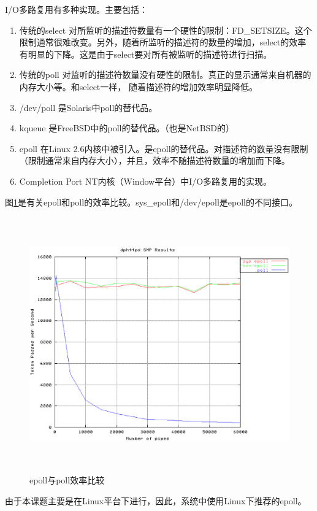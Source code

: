 \documentclass[12pt, twoside, a4paper, xetex]{report}
\begin{document}
	I/O多路复用有多种实现。主要包括：
	\begin{enumerate}
		\item 传统的select 对所监听的描述符数量有一个硬性的限制：FD\_SETSIZE。这个限制通常很难改变。另外，随着所监听的描述符的数量的增加，select的效率有明显的下降。这是由于select要对所有被监听的描述符进行扫描。
		\item 传统的poll 对监听的描述符数量没有硬性的限制。真正的显示通常来自机器的内存大小等。和select一样， 随着描述符的增加效率明显降低。
		\item /dev/poll 是Solaris中poll的替代品。
		\item kqueue 是FreeBSD中的poll的替代品。（也是NetBSD的）
		\item epoll 在Linux 2.6内核中被引入。是epoll的替代品。对描述符的数量没有限制（限制通常来自内存大小），并且，效率不随描述符数量的增加而下降。
		\item Completion Port NT内核（Window平台）中I/O多路复用的实现。
	\end{enumerate}
	
	图\ref{epollvspoll}是有关epoll和poll的效率比较。sys\_epoll和/dev/epoll是epoll的不同接口。
	\begin{figure}[htbp]
	\centering
	\caption{epoll与poll效率比较}
	\label{epollvspoll}
	\includegraphics[height=11cm, width=15cm]{pics/epollvspoll.eps}
	\end{figure}
	
	由于本课题主要是在Linux平台下进行，因此，系统中使用Linux下推荐的epoll。
	
\end{document}
